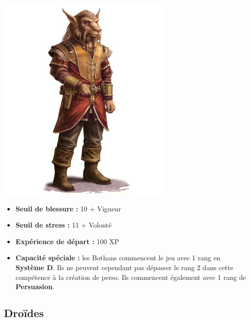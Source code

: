 \documentclass[twoside]{article}
\begin{document}
\noindent\begin{minipage}{0.3\textwidth}
	\includegraphics[width=1\linewidth]{../img/species/bothan}
\end{minipage}%
\hfill%
\begin{minipage}{0.7\textwidth}\raggedleft
	\begin{itemize}
		\item \textbf{Seuil de blessure :} 10 + Vigueur 
		\item \textbf{Seuil de stress :} 11 + Volonté 
		\item \textbf{Expérience de départ :} 100 XP
		\item \textbf{Capacité spéciale :} les Bothans commencent le jeu avec 1 rang en \textbf{Système D}. Ils ne peuvent cependant pas dépasser le rang 2 dans cette compétence à la création de perso. Ils commencent également avec 1 rang de \textbf{Persuasion}.
	\end{itemize}
\end{minipage}

\subsection*{Droïdes}
\end{document}
